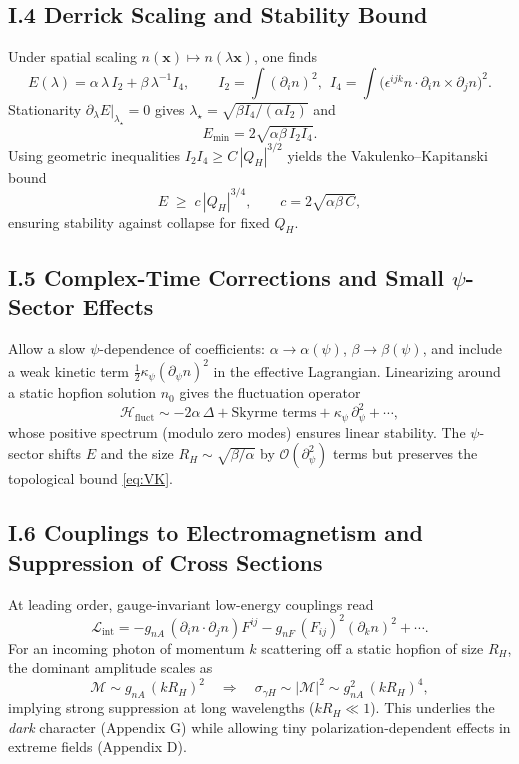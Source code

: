 \subsection*{I.4 Derrick Scaling and Stability Bound}
Under spatial scaling $n(\mathbf{x})\mapsto n(\lambda\mathbf{x})$, one finds
\begin{equation}
E(\lambda)=\alpha\,\lambda\,I_2+\beta\,\lambda^{-1} I_4,\qquad
I_2=\int (\partial_i n)^2,\ \ I_4=\int \big(\epsilon^{ijk}n\cdot\partial_i n\times\partial_j n\big)^2.
\end{equation}
Stationarity $\partial_\lambda E|_{\lambda_\star}=0$ gives $\lambda_\star=\sqrt{\beta I_4/(\alpha I_2)}$ and
\begin{equation}
E_{\min}=2\sqrt{\alpha\beta\,I_2 I_4}.
\end{equation}
Using geometric inequalities $I_2 I_4 \ge C\,|Q_H|^{3/2}$ yields the Vakulenko--Kapitanski bound
\begin{equation}
E \;\ge\; c\, |Q_H|^{3/4},\qquad c=2\sqrt{\alpha\beta\,C},
\label{eq:VK}
\end{equation}
ensuring stability against collapse for fixed $Q_H$.

\subsection*{I.5 Complex-Time Corrections and Small $\psi$-Sector Effects}
Allow a slow $\psi$-dependence of coefficients: $\alpha\to\alpha(\psi)$, $\beta\to\beta(\psi)$, and include a weak kinetic term $\frac12\kappa_\psi(\partial_\psi n)^2$ in the effective Lagrangian. 
Linearizing around a static hopfion solution $n_0$ gives the fluctuation operator
\begin{equation}
\mathcal{H}_{\mathrm{fluct}} \sim -2\alpha\,\Delta + \text{Skyrme terms} + \kappa_\psi\,\partial_\psi^2 + \cdots,
\end{equation}
whose positive spectrum (modulo zero modes) ensures linear stability. 
The $\psi$-sector shifts $E$ and the size $R_H\sim\sqrt{\beta/\alpha}$ by $\mathcal{O}(\partial_\psi^2)$ terms but preserves the topological bound \eqref{eq:VK}.

\subsection*{I.6 Couplings to Electromagnetism and Suppression of Cross Sections}
At leading order, gauge-invariant low-energy couplings read
\begin{equation}
\mathcal{L}_{\mathrm{int}}=- g_{nA}\,(\partial_i n\cdot\partial_j n) F^{ij} - g_{nF}\, (F_{ij})^2 (\partial_k n)^2 + \cdots.
\label{eq:Lint}
\end{equation}
For an incoming photon of momentum $k$ scattering off a static hopfion of size $R_H$, the dominant amplitude scales as
\begin{equation}
\mathcal{M} \sim g_{nA}\, (k R_H)^2\quad\Rightarrow\quad \sigma_{\gamma H}\sim |\mathcal{M}|^2 \sim g_{nA}^2\,(k R_H)^4,
\end{equation}
implying strong suppression at long wavelengths ($kR_H\ll 1$). 
This underlies the \emph{dark} character (Appendix G) while allowing tiny polarization-dependent effects in extreme fields (Appendix D).

